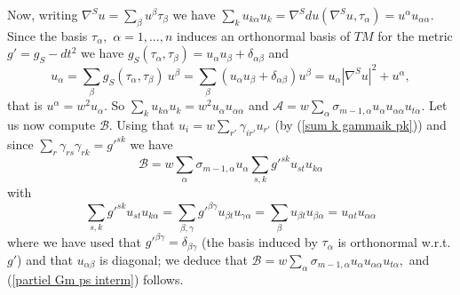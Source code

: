 \documentclass[10pt,reqno,oneside]{amsart}
\theoremstyle{definition}
\theoremstyle{remark}
\begin{document}
Now, writing $\nabla^Su=\sum_{\beta}u^{\beta}\tau_{\beta}$ we have $\sum_ku_{k\alpha}u_k=\nabla^Sdu(\nabla^Su,\tau_{\alpha})=u^{\alpha}u_{\alpha\alpha}.$ Since the basis $\tau_{\alpha},$ $\alpha=1,\ldots,n$ induces an orthonormal basis of $TM$ for the metric $g'=g_S-dt^2$ we have $g_S(\tau_{\alpha},\tau_{\beta})=u_{\alpha}u_{\beta}+\delta_{\alpha\beta}$ and
$$u_{\alpha}=\sum_{\beta}g_S(\tau_{\alpha},\tau_{\beta})\ u^{\beta}=\sum_{\beta}\left(u_{\alpha}u_{\beta}+\delta_{\alpha\beta}\right)u^{\beta}=u_{\alpha}|\nabla^Su|^2+u^{\alpha},$$
that is $u^{\alpha}=w^2u_{\alpha}.$ So $\sum_ku_{k\alpha}u_k=w^2u_{\alpha}u_{\alpha\alpha}$ and $\displaystyle{\mathcal{A}=w\sum_{\alpha}\sigma_{m-1,\alpha}u_{\alpha}u_{\alpha\alpha}u_{t\alpha}.}$ Let us now compute $\mathcal{B}$. Using that $u_i=w\sum_{r'}\gamma_{ir'}u_{r'}$ (by (\ref{sum k gammaik pk})) and since $\sum_{r}\gamma_{rs}\gamma_{rk}={g'}^{sk}$ we have 
$$\displaystyle{\mathcal{B}=w\sum_{\alpha}\sigma_{m-1,\alpha}u_{\alpha}\sum_{s,k}{g'}^{sk}u_{st}u_{k\alpha}}$$ 
with
$$\sum_{s,k}{g'}^{sk}u_{st}u_{k\alpha}=\sum_{\beta,\gamma}{g'}^{\beta\gamma}u_{\beta t}u_{\gamma\alpha}=\sum_{\beta}u_{\beta t}u_{\beta\alpha}=u_{\alpha t}u_{\alpha\alpha}$$
where we have used that ${g'}^{\beta\gamma}=\delta_{\beta\gamma}$ (the basis induced by $\tau_{\alpha}$ is orthonormal w.r.t. $g'$) and that $u_{\alpha\beta}$ is diagonal; we deduce that $\mathcal{B}=w\sum_{\alpha}\sigma_{m-1,\alpha}u_{\alpha}u_{\alpha\alpha}u_{t\alpha},$ and (\ref{partiel Gm ps interm}) follows.
\\
\end{document}
